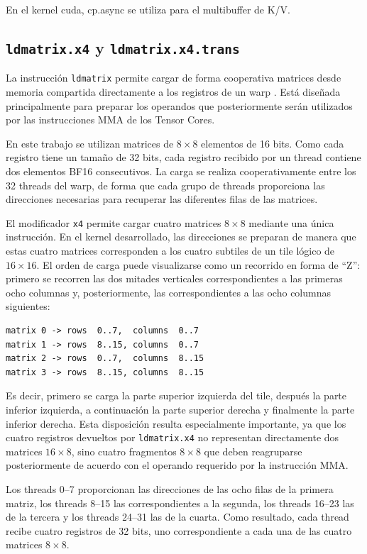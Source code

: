 En el kernel cuda, cp.async se utiliza para el multibuffer de K/V.

\subsection{\texttt{ldmatrix.x4} y \texttt{ldmatrix.x4.trans}}

La instrucción \texttt{ldmatrix} permite cargar de forma cooperativa matrices desde memoria compartida directamente a los registros de un warp \cite{nvidiaPTX}. Está diseñada principalmente para preparar los operandos que posteriormente serán utilizados por las instrucciones MMA de los Tensor Cores.

En este trabajo se utilizan matrices de \(8\times8\) elementos de 16 bits. Como cada registro tiene un tamaño de 32 bits, cada registro recibido por un thread contiene dos elementos BF16 consecutivos. La carga se realiza cooperativamente entre los 32 threads del warp, de forma que cada grupo de threads proporciona las direcciones necesarias para recuperar las diferentes filas de las matrices.

El modificador \texttt{x4} permite cargar cuatro matrices \(8\times8\) mediante una única instrucción. En el kernel desarrollado, las direcciones se preparan de manera que estas cuatro matrices corresponden a los cuatro subtiles de un tile lógico de \(16\times16\). El orden de carga puede visualizarse como un recorrido en forma de ``Z'': primero se recorren las dos mitades verticales correspondientes a las primeras ocho columnas y, posteriormente, las correspondientes a las ocho columnas siguientes:

\begin{verbatim}
matrix 0 -> rows  0..7,  columns  0..7
matrix 1 -> rows  8..15, columns  0..7
matrix 2 -> rows  0..7,  columns  8..15
matrix 3 -> rows  8..15, columns  8..15
\end{verbatim}

Es decir, primero se carga la parte superior izquierda del tile, después la parte inferior izquierda, a continuación la parte superior derecha y finalmente la parte inferior derecha. Esta disposición resulta especialmente importante, ya que los cuatro registros devueltos por \texttt{ldmatrix.x4} no representan directamente dos matrices \(16\times8\), sino cuatro fragmentos \(8\times8\) que deben reagruparse posteriormente de acuerdo con el operando requerido por la instrucción MMA.

Los threads 0--7 proporcionan las direcciones de las ocho filas de la primera matriz, los threads 8--15 las correspondientes a la segunda, los threads 16--23 las de la tercera y los threads 24--31 las de la cuarta. Como resultado, cada thread recibe cuatro registros de 32 bits, uno correspondiente a cada una de las cuatro matrices \(8\times8\).

